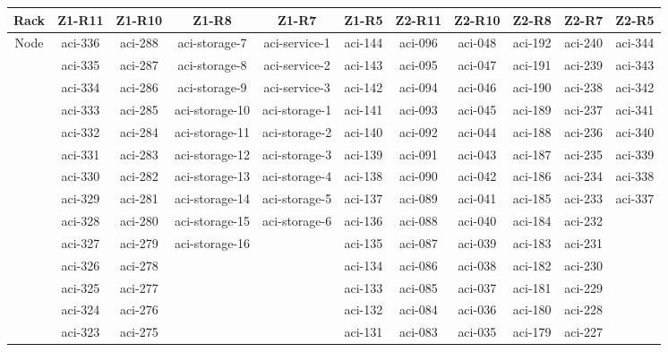 \documentclass[10pt,letterpaper]{article}
\begin{document}
        \begin{center}
        \begin{tabular}{ |c|c|c|c|c|c|c|c|c|c|c|}
        \hline
        Rack & Z1-R11 & Z1-R10 & Z1-R8 & Z1-R7 & Z1-R5 & Z2-R11 & Z2-R10 & Z2-R8 & Z2-R7 & Z2-R5 \\
        \hline
        \multirow{1}{3em}{Node}
        & aci-336 & aci-288 & aci-storage-7  & aci-service-1 & aci-144 & aci-096 & aci-048 & aci-192 & aci-240 & aci-344 \\
        & aci-335 & aci-287 & aci-storage-8  & aci-service-2 & aci-143 & aci-095 & aci-047 & aci-191 & aci-239 & aci-343 \\
        & aci-334 & aci-286 & aci-storage-9  & aci-service-3 & aci-142 & aci-094 & aci-046 & aci-190 & aci-238 & aci-342 \\
        & aci-333 & aci-285 & aci-storage-10 & aci-storage-1 & aci-141 & aci-093 & aci-045 & aci-189 & aci-237 & aci-341 \\
        & aci-332 & aci-284 & aci-storage-11 & aci-storage-2 & aci-140 & aci-092 & aci-044 & aci-188 & aci-236 & aci-340 \\
        & aci-331 & aci-283 & aci-storage-12 & aci-storage-3 & aci-139 & aci-091 & aci-043 & aci-187 & aci-235 & aci-339 \\
        & aci-330 & aci-282 & aci-storage-13 & aci-storage-4 & aci-138 & aci-090 & aci-042 & aci-186 & aci-234 & aci-338 \\
        & aci-329 & aci-281 & aci-storage-14 & aci-storage-5 & aci-137 & aci-089 & aci-041 & aci-185 & aci-233 & aci-337 \\
        & aci-328 & aci-280 & aci-storage-15 & aci-storage-6 & aci-136 & aci-088 & aci-040 & aci-184 & aci-232 &         \\
        & aci-327 & aci-279 & aci-storage-16 &               & aci-135 & aci-087 & aci-039 & aci-183 & aci-231 &         \\
        & aci-326 & aci-278 &                &               & aci-134 & aci-086 & aci-038 & aci-182 & aci-230 &         \\
        & aci-325 & aci-277 &                &               & aci-133 & aci-085 & aci-037 & aci-181 & aci-229 &         \\
        & aci-324 & aci-276 &                &               & aci-132 & aci-084 & aci-036 & aci-180 & aci-228 &         \\
        & aci-323 & aci-275 &                &               & aci-131 & aci-083 & aci-035 & aci-179 & aci-227 &         \\

\end{tabular}
\end{center}
\end{document}
